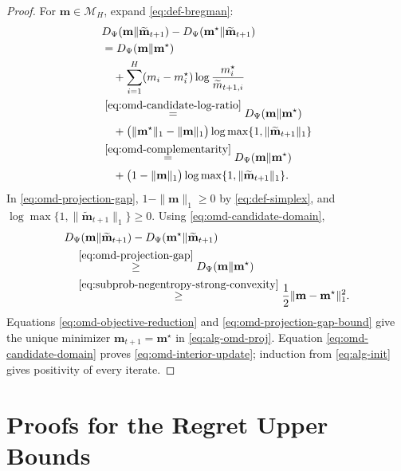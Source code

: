 \documentclass[journal]{IEEEtran}
\theoremstyle{remark}
\begin{document}
\begin{proof}
For $\mathbf{m}\in\mathcal{M}_H$, expand \eqref{eq:def-bregman}:
\begin{equation}
\label{eq:omd-projection-gap}
\begin{aligned}
&D_\Psi(\mathbf{m}\|\widetilde{\mathbf{m}}_{t+1})
-D_\Psi(\mathbf{m}^\star\|\widetilde{\mathbf{m}}_{t+1}) \\
&=D_\Psi(\mathbf{m}\|\mathbf{m}^\star)
\\
&\quad+\sum_{i=1}^H(m_i-m_i^\star)
 \log\frac{m_i^\star}{\widetilde{m}_{t+1,i}}\\
&\overset{\eqref{eq:omd-candidate-log-ratio}}{=}
D_\Psi(\mathbf{m}\|\mathbf{m}^\star)
\\
&\quad+\bigl(\|\mathbf{m}^\star\|_1-\|\mathbf{m}\|_1\bigr)
\log\max\{1,\|\widetilde{\mathbf{m}}_{t+1}\|_1\}\\
&\overset{\eqref{eq:omd-complementarity}}{=}
D_\Psi(\mathbf{m}\|\mathbf{m}^\star)
\\
&\quad+\bigl(1-\|\mathbf{m}\|_1\bigr)
\log\max\{1,\|\widetilde{\mathbf{m}}_{t+1}\|_1\}.
\end{aligned}
\end{equation}
In \eqref{eq:omd-projection-gap}, $1-\|\mathbf{m}\|_1\ge0$ by
\eqref{eq:def-simplex}, and $\log\max\{1,\|\widetilde{\mathbf{m}}_{t+1}\|_1\}\ge0$.
Using \eqref{eq:omd-candidate-domain},
\begin{equation}
\label{eq:omd-projection-gap-bound}
\begin{aligned}
&D_\Psi(\mathbf{m}\|\widetilde{\mathbf{m}}_{t+1})
-D_\Psi(\mathbf{m}^\star\|\widetilde{\mathbf{m}}_{t+1})\\
&\quad\overset{\eqref{eq:omd-projection-gap}}{\ge}
D_\Psi(\mathbf{m}\|\mathbf{m}^\star)\\
&\quad\overset{\eqref{eq:subprob-negentropy-strong-convexity}}{\ge}
\frac12\|\mathbf{m}-\mathbf{m}^\star\|_1^2.
\end{aligned}
\end{equation}
Equations \eqref{eq:omd-objective-reduction} and
\eqref{eq:omd-projection-gap-bound} give the unique minimizer
$\mathbf{m}_{t+1}=\mathbf{m}^\star$ in \eqref{eq:alg-omd-proj}.
Equation \eqref{eq:omd-candidate-domain} proves \eqref{eq:omd-interior-update};
induction from \eqref{eq:alg-init} gives positivity of every iterate.
\end{proof}

\section{Proofs for the Regret Upper Bounds}
\label{sec:appendix-regret-proofs}
\end{document}

